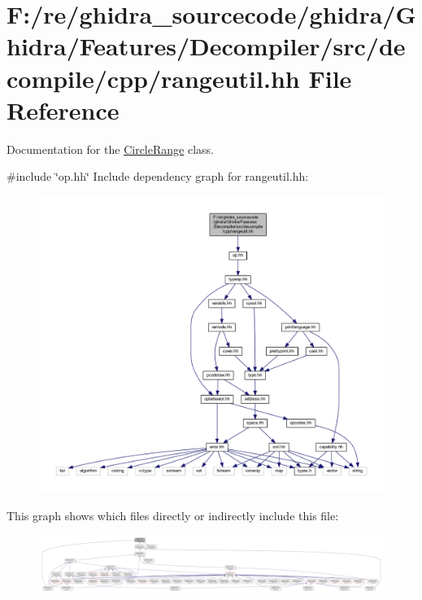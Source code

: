 \hypertarget{rangeutil_8hh}{}\section{F\+:/re/ghidra\+\_\+sourcecode/ghidra/\+Ghidra/\+Features/\+Decompiler/src/decompile/cpp/rangeutil.hh File Reference}
\label{rangeutil_8hh}


Documentation for the \mbox{\hyperlink{class_circle_range}{Circle\+Range}} class.  


{\ttfamily \#include \char`\"{}op.\+hh\char`\"{}}\newline
Include dependency graph for rangeutil.\+hh\+:
\nopagebreak
\begin{figure}[H]
\begin{center}
\leavevmode
\includegraphics[width=350pt]{rangeutil_8hh__incl}
\end{center}
\end{figure}
This graph shows which files directly or indirectly include this file\+:
\nopagebreak
\begin{figure}[H]
\begin{center}
\leavevmode
\includegraphics[width=350pt]{rangeutil_8hh__dep__incl}
\end{center}
\end{figure}
